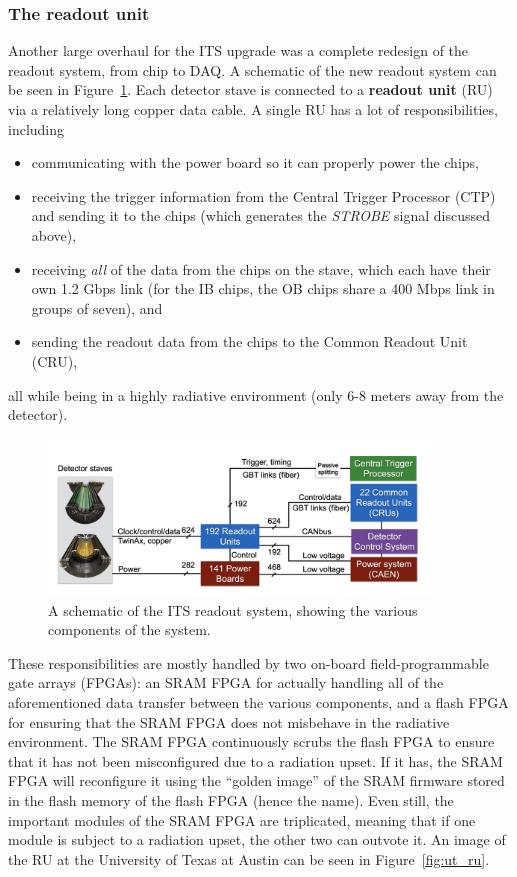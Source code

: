 \subsubsection{The readout unit}
Another large overhaul for the ITS upgrade was a complete redesign of the readout system, from chip to DAQ. A schematic of the new readout system can be seen in Figure~\ref{fig:its_readout}. Each detector stave is connected to a \textbf{readout unit} (RU) via a relatively long copper data cable. A single RU has a lot of responsibilities, including
\begin{itemize}
    \item communicating with the power board so it can properly power the chips,
    \item receiving the trigger information from the Central Trigger Processor (CTP) and sending it to the chips (which generates the \textit{STROBE} signal discussed above),
    \item receiving \textit{all} of the data from the chips on the stave, which each have their own 1.2 Gbps link (for the IB chips, the OB chips share a 400 Mbps link in groups of seven), and
    \item sending the readout data from the chips to the Common Readout Unit (CRU), 
\end{itemize}
all while being in a highly radiative environment (only 6-8 meters away from the detector). 

\begin{figure}[h]
    \centering
    \includegraphics[width=0.9\textwidth]{figures/experiment/its_readout.png}
    \caption{A schematic of the ITS readout system, showing the various components of the system.}
    \label{fig:its_readout}
\end{figure}

These responsibilities are mostly handled by two on-board field-programmable gate arrays (FPGAs): an SRAM FPGA for actually handling all of the aforementioned data transfer between the various components, and a flash FPGA for ensuring that the SRAM FPGA does not misbehave in the radiative environment. The SRAM FPGA continuously scrubs the flash FPGA to ensure that it has not been misconfigured due to a radiation upset. If it has, the SRAM FPGA will reconfigure it using the ``golden image'' of the SRAM firmware stored in the flash memory of the flash FPGA (hence the name). Even still, the important modules of the SRAM FPGA are triplicated, meaning that if one module is subject to a radiation upset, the other two can outvote it. An image of the RU at the University of Texas at Austin can be seen in Figure~\ref{fig:ut_ru}.

